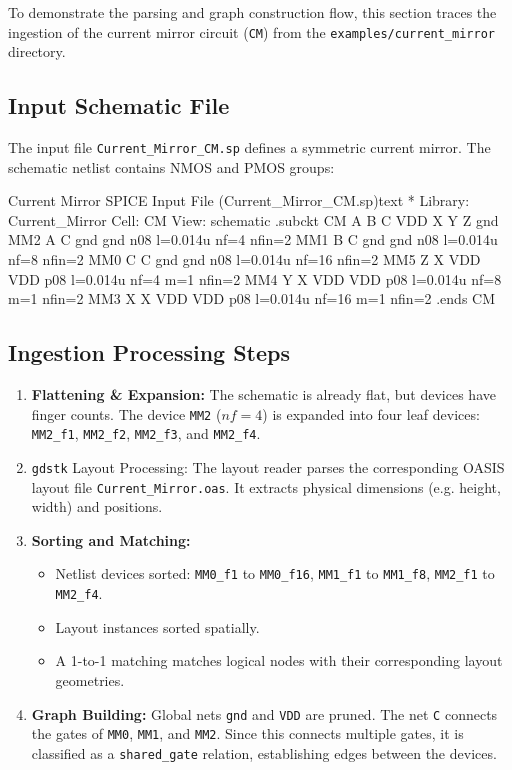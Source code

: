 To demonstrate the parsing and graph construction flow, this section traces the ingestion of the current mirror circuit (\texttt{CM}) from the \texttt{examples/current\_mirror} directory.

\subsection{Input Schematic File}
The input file \texttt{Current\_Mirror\_CM.sp} defines a symmetric current mirror. The schematic netlist contains NMOS and PMOS groups:

\begin{thesiscode}{Current Mirror SPICE Input File (Current\_Mirror\_CM.sp)}{text}
* Library: Current_Mirror  Cell: CM  View: schematic
.subckt CM A B C VDD X Y Z gnd
MM2 A C gnd gnd n08 l=0.014u nf=4 nfin=2
MM1 B C gnd gnd n08 l=0.014u nf=8 nfin=2
MM0 C C gnd gnd n08 l=0.014u nf=16 nfin=2
MM5 Z X VDD VDD p08 l=0.014u nf=4 m=1 nfin=2
MM4 Y X VDD VDD p08 l=0.014u nf=8 m=1 nfin=2
MM3 X X VDD VDD p08 l=0.014u nf=16 m=1 nfin=2
.ends CM
\end{thesiscode}

\subsection{Ingestion Processing Steps}
\begin{enumerate}
    \item \textbf{Flattening \& Expansion:} The schematic is already flat, but devices have finger counts. The device \texttt{MM2} ($nf=4$) is expanded into four leaf devices: \texttt{MM2\_f1}, \texttt{MM2\_f2}, \texttt{MM2\_f3}, and \texttt{MM2\_f4}.
    \item \texttt{gdstk} Layout Processing: The layout reader parses the corresponding OASIS layout file \texttt{Current\_Mirror.oas}. It extracts physical dimensions (e.g. height, width) and positions.
    \item \textbf{Sorting and Matching:}
        \begin{itemize}
            \item Netlist devices sorted: \texttt{MM0\_f1} to \texttt{MM0\_f16}, \texttt{MM1\_f1} to \texttt{MM1\_f8}, \texttt{MM2\_f1} to \texttt{MM2\_f4}.
            \item Layout instances sorted spatially.
            \item A 1-to-1 matching matches logical nodes with their corresponding layout geometries.
        \end{itemize}
    \item \textbf{Graph Building:} Global nets \texttt{gnd} and \texttt{VDD} are pruned. The net \texttt{C} connects the gates of \texttt{MM0}, \texttt{MM1}, and \texttt{MM2}. Since this connects multiple gates, it is classified as a \texttt{shared\_gate} relation, establishing edges between the devices.
\end{enumerate}

